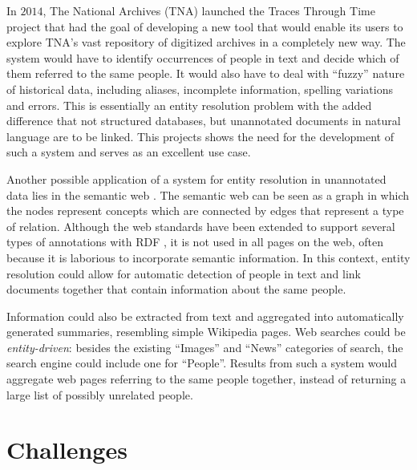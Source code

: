 In $2014$, The National Archives (TNA) launched the Traces Through Time project that had the goal of developing a new tool that would enable its users to explore TNA's vast repository of digitized archives in a completely new way.
The system would have to identify occurrences of people in text and decide which of them referred to the same people.
It would also have to deal with ``fuzzy'' nature of historical data, including aliases, incomplete information, spelling variations and errors.
This is essentially an entity resolution problem with the added difference that not structured databases, but unannotated documents in natural language are to be linked.
This projects shows the need for the development of such a system and serves as an excellent use case.

Another possible application of a system for entity resolution in unannotated data lies in the semantic web \citep{Berners2001, Mihalcea2007}.
The semantic web can be seen as a graph in which the nodes represent concepts which are connected by edges that represent a type of relation.
Although the web standards have been extended to support several types of annotations with RDF \citep{Pan2009}, it is not used in all pages on the web, often because it is laborious to incorporate semantic information.
In this context, entity resolution could allow for automatic detection of people in text and link documents together that contain information about the same people.

Information could also be extracted from text and aggregated into automatically generated summaries, resembling simple Wikipedia \citep{Wikipedia} pages.
Web searches could be \emph{entity-driven}: besides the existing ``Images'' and ``News'' categories of search, the search engine could include one for ``People''.
Results from such a system would aggregate web pages referring to the same people together, instead of returning a large list of possibly unrelated people.




\section{Challenges}
\label{sec:challenges}

